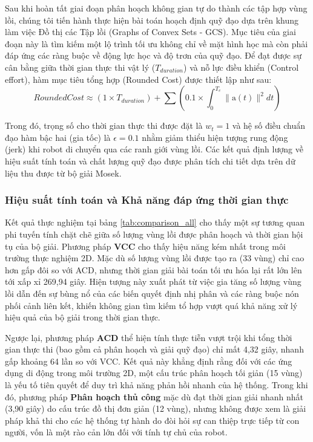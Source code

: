 Sau khi hoàn tất giai đoạn phân hoạch không gian tự do thành các tập hợp vùng lồi, chúng tôi tiến hành thực hiện bài toán hoạch định quỹ đạo dựa trên khung làm việc Đồ thị các Tập lồi (Graphs of Convex Sets - GCS). Mục tiêu của giai đoạn này là tìm kiếm một lộ trình tối ưu không chỉ về mặt hình học mà còn phải đáp ứng các ràng buộc về động lực học và độ trơn của quỹ đạo. Để đạt được sự cân bằng giữa thời gian thực thi vật lý ($T_{duration}$) và nỗ lực điều khiển (Control effort), hàm mục tiêu tổng hợp (Rounded Cost) được thiết lập như sau:
$$Rounded Cost \approx (1 \times T_{duration}) + \sum \left( 0.1 \times \int_{0}^{T_e} \|\text{a}(t)\|^2 dt \right)$$

Trong đó, trọng số cho thời gian thực thi được đặt là $w_{t}=1$ và hệ số điều chuẩn đạo hàm bậc hai (gia tốc) là $\epsilon = 0.1$ nhằm giảm thiểu hiện tượng rung động (jerk) khi robot di chuyển qua các ranh giới vùng lồi. Các kết quả định lượng về hiệu suất tính toán và chất lượng quỹ đạo được phân tích chi tiết dựa trên dữ liệu thu được từ bộ giải Mosek.

\subsubsection{Hiệu suất tính toán và Khả năng đáp ứng thời gian thực}

Kết quả thực nghiệm tại bảng \ref{tab:comparison_all} cho thấy một sự tương quan phi tuyến tính chặt chẽ giữa số lượng vùng lồi được phân hoạch và thời gian hội tụ của bộ giải. Phương pháp \textbf{VCC} cho thấy hiệu năng kém nhất trong môi trường thực nghiệm 2D. Mặc dù số lượng vùng lồi được tạo ra (33 vùng) chỉ cao hơn gấp đôi so với ACD, nhưng thời gian giải bài toán tối ưu hóa lại rất lớn lên tới xấp xỉ 269,94 giây. Hiện tượng này xuất phát từ việc gia tăng số lượng vùng lồi dẫn đến sự bùng nổ của các biến quyết định nhị phân  và các ràng buộc nón phối cảnh liên kết, khiến không gian tìm kiếm tổ hợp vượt quá khả năng xử lý hiệu quả của bộ giải trong thời gian thực.

Ngược lại, phương pháp \textbf{ACD} thể hiện tính thực tiễn vượt trội khi tổng thời gian thực thi (bao gồm cả phân hoạch và giải quỹ đạo) chỉ mất 4,32 giây, nhanh gấp khoảng 64 lần so với VCC. Kết quả này khẳng định rằng đối với các ứng dụng di động trong môi trường 2D, một cấu trúc phân hoạch tối giản (15 vùng) là yếu tố tiên quyết để duy trì khả năng phản hồi nhanh của hệ thống. Trong khi đó, phương pháp \textbf{Phân hoạch thủ công} mặc dù đạt thời gian giải nhanh nhất (3,90 giây) do cấu trúc đồ thị đơn giản (12 vùng), nhưng không được xem là giải pháp khả thi cho các hệ thống tự hành do đòi hỏi sự can thiệp trực tiếp từ con người, vốn là một rào cản lớn đối với tính tự chủ của robot.


